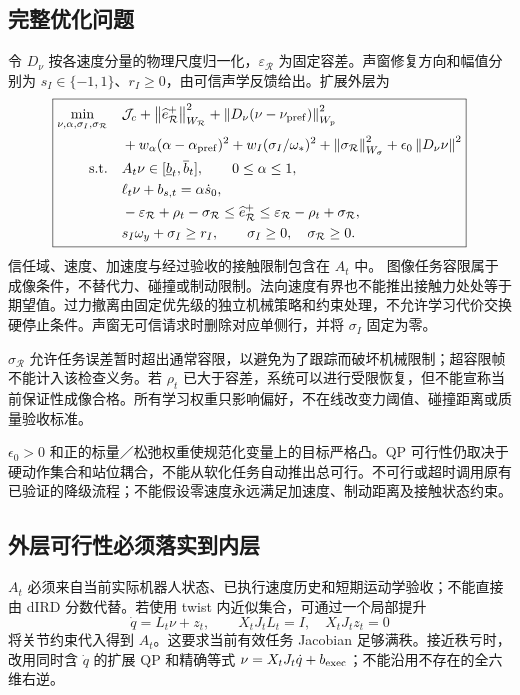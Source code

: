 \documentclass[UTF8,11pt,a4paper,fontset=fandol]{ctexart}
\numberwithin{equation}{section}
\theoremstyle{definition}
\newcommand{\norm}[1]{\left\lVert#1\right\rVert}
\begin{document}
\subsection{完整优化问题}
令 $D_\nu$ 按各速度分量的物理尺度归一化，$\varepsilon_{\mathcal R}$ 为固定容差。声窗修复方向和幅值分别为 $s_I\in\{-1,1\}$、$r_I\ge0$，由可信声学反馈给出。扩展外层为
\begin{equation}
\boxed{
\begin{aligned}
\min_{\nu,\alpha,\sigma_I,\sigma_{\mathcal R}}\quad &
\mathcal J_c
+\norm{\widehat e_{\mathcal R}^+}_{W_{\mathcal R}}^2
+\norm{D_\nu(\nu-\nu_{\rm pref})}_{W_p}^2\\
&+w_\alpha(\alpha-\alpha_{\rm pref})^2
+w_I(\sigma_I/\omega_*)^2+\norm{\sigma_{\mathcal R}}_{W_\sigma}^2
+\epsilon_0\norm{D_\nu\nu}^2\\
\text{s.t.}\quad & A_t\nu\in[\underline b_t,\overline b_t],\qquad 0\le\alpha\le1,\\
&\ell_t\nu+b_{s,t}=\alpha\dot s_0,\\
&-\varepsilon_{\mathcal R}+\rho_t-\sigma_{\mathcal R}
\le\widehat e_{\mathcal R}^+
\le\varepsilon_{\mathcal R}-\rho_t+\sigma_{\mathcal R},\\
&s_I\omega_y+\sigma_I\ge r_I,\qquad
\sigma_I\ge0,\quad\sigma_{\mathcal R}\ge0.
\end{aligned}}
\label{eq:fullqp}
\end{equation}
信任域、速度、加速度与经过验收的接触限制包含在 $A_t$ 中。 图像任务容限属于成像条件，不替代力、碰撞或制动限制。法向速度有界也不能推出接触力处处等于期望值。过力撤离由固定优先级的独立机械策略和约束处理，不允许学习代价交换硬停止条件。声窗无可信请求时删除对应单侧行，并将 $\sigma_I$ 固定为零。

$\sigma_{\mathcal R}$ 允许任务误差暂时超出通常容限，以避免为了跟踪而破坏机械限制；超容限帧不能计入该检查义务。若 $\rho_t$ 已大于容差，系统可以进行受限恢复，但不能宣称当前保证性成像合格。所有学习权重只影响偏好，不在线改变力阈值、碰撞距离或质量验收标准。

$\epsilon_0>0$ 和正的标量／松弛权重使规范化变量上的目标严格凸。QP 可行性仍取决于硬动作集合和站位耦合，不能从软化任务自动推出总可行。不可行或超时调用原有已验证的降级流程；不能假设零速度永远满足加速度、制动距离及接触状态约束。

\subsection{外层可行性必须落实到内层}
$A_t$ 必须来自当前实际机器人状态、已执行速度历史和短期运动学验收；不能直接由 dIRD 分数代替。若使用 twist 内近似集合，可通过一个局部提升
\begin{equation}
\dot q=L_t\nu+z_t,\qquad
X_tJ_tL_t=I,\quad X_tJ_tz_t=0
\label{eq:lift}
\end{equation}
将关节约束代入得到 $A_t$。这要求当前有效任务 Jacobian 足够满秩。接近秩亏时，改用同时含 $\dot q$ 的扩展 QP 和精确等式 $\nu=X_tJ_t\dot q+b_{\rm exec}$；不能沿用不存在的全六维右逆。
\end{document}
